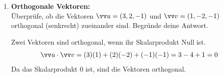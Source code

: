\documentclass[11pt, a4paper]{article}
\begin{document}
\begin{enumerate}[label=\textbf{\arabic*.},itemsep=0.50cm]
    \item \textbf{Orthogonale Vektoren:} \\
    Überprüfe, ob die Vektoren $\ivec{u} = (3, 2, -1)$ und $\ivec{v} = (1, -2, -1)$ orthogonal (senkrecht) zueinander sind. 
    Begründe deine Antwort.
    \begin{solutionbox}
        Zwei Vektoren sind orthogonal, wenn ihr Skalarprodukt Null ist.
        \[ \ivec{u} \cdot \ivec{v} = (3)(1) + (2)(-2) + (-1)(-1) = 3 - 4 + 1 = 0 \]
        Da das Skalarprodukt 0 ist, sind die Vektoren orthogonal.
    \end{solutionbox}
    
\end{enumerate}

\vspace{1cm}
\end{document}
